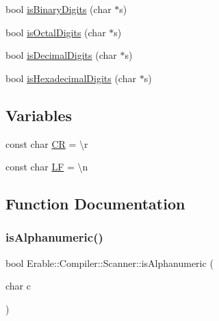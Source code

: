 \begin{DoxyCompactItemize}
\item 
bool \mbox{\hyperlink{namespace_erable_1_1_compiler_1_1_scanner_aa42b8316aba92ddd56c2fe97a09610f0}{is\+Binary\+Digits}} (char $\ast$s)
\item 
bool \mbox{\hyperlink{namespace_erable_1_1_compiler_1_1_scanner_ac74ca002180b67805016fe0838545191}{is\+Octal\+Digits}} (char $\ast$s)
\item 
bool \mbox{\hyperlink{namespace_erable_1_1_compiler_1_1_scanner_aaae7339570deefb7d3ccea640d9bf9f1}{is\+Decimal\+Digits}} (char $\ast$s)
\item 
bool \mbox{\hyperlink{namespace_erable_1_1_compiler_1_1_scanner_a9340db3af8e3f06a1debdd7297cfb0f9}{is\+Hexadecimal\+Digits}} (char $\ast$s)
\end{DoxyCompactItemize}
\subsection*{Variables}
\begin{DoxyCompactItemize}
\item 
const char \mbox{\hyperlink{namespace_erable_1_1_compiler_1_1_scanner_a448286ccbfe61f115d958d81a0fda06e}{CR}} = \textquotesingle{}\textbackslash{}r\textquotesingle{}
\item 
const char \mbox{\hyperlink{namespace_erable_1_1_compiler_1_1_scanner_ae17c1513c4db199da5e772c0da011132}{LF}} = \textquotesingle{}\textbackslash{}n\textquotesingle{}
\end{DoxyCompactItemize}


\subsection{Function Documentation}
\mbox{\label{namespace_erable_1_1_compiler_1_1_scanner_afc801f00de7d279a3ce4d8e1c13bca57}} 
\subsubsection{\texorpdfstring{isAlphanumeric()}{isAlphanumeric()}}
{\footnotesize\ttfamily bool Erable\+::\+Compiler\+::\+Scanner\+::is\+Alphanumeric (\begin{DoxyParamCaption}\item[{char}]{c }\end{DoxyParamCaption})\hspace{0.3cm}{\ttfamily [inline]}}

